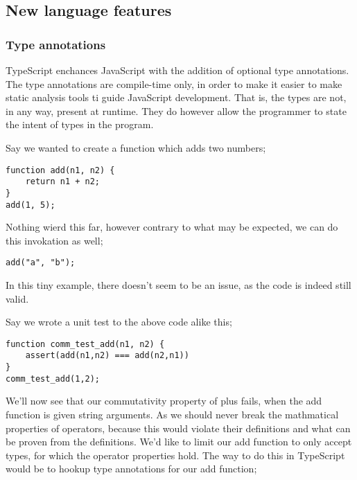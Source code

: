 
\subsection*{New language features}
\subsubsection*{Type annotations}
TypeScript enchances JavaScript with the addition of optional type
annotations.  The type annotations are compile-time only, in order to
make it easier to make static analysis tools ti guide JavaScript
development.  That is, the types are not, in any way, present at
runtime. They do however allow the programmer to state the intent of
types in the program.

Say we wanted to create a function which adds two numbers;
\begin{verbatim}
function add(n1, n2) {
    return n1 + n2;
}
add(1, 5);
\end{verbatim}
Nothing wierd this far, however contrary to what may be expected, we can do this invokation as well;
\begin{verbatim}
add("a", "b");
\end{verbatim}
In this tiny example, there doesn't seem to be an issue, as the code is indeed still valid.

Say we wrote a unit test to the above code alike this;
\begin{verbatim}
function comm_test_add(n1, n2) {
    assert(add(n1,n2) === add(n2,n1))
}
comm_test_add(1,2);
\end{verbatim}

We'll now see that our commutativity property of plus fails, when the
add function is given string arguments.  As we should never break the
mathmatical properties of operators, because this would violate their
definitions and what can be proven from the definitions.  We'd like to
limit our add function to only accept types, for which the operator
properties hold.  The way to do this in TypeScript would be to hookup
type annotations for our add function;

